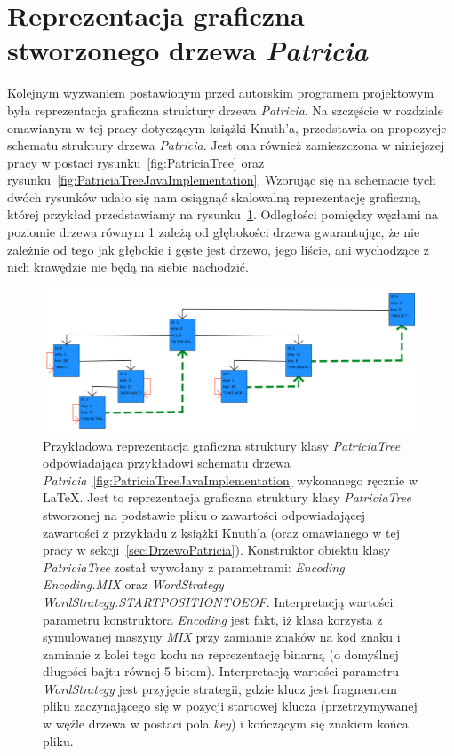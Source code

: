 		\section{Reprezentacja graficzna stworzonego drzewa \emph{Patricia}}\label{sec:czescPraktycznaReprezentacjaGraficzna}
		
		Kolejnym wyzwaniem postawionym przed autorskim programem projektowym była reprezentacja graficzna struktury drzewa \emph{Patricia}. Na szczęście w rozdziale omawianym w tej pracy dotyczącym książki Knuth'a, przedstawia on propozycje schematu struktury drzewa \emph{Patricia}. Jest ona również zamieszczona w niniejszej pracy w postaci rysunku~\ref{fig:PatriciaTree} oraz rysunku~\ref{fig:PatriciaTreeJavaImplementation}. Wzorując się na schemacie tych dwóch rysunków udało się nam osiągnąć skalowalną reprezentację graficzną, której przykład przedstawiamy na rysunku~\ref{fig:PatriciaTreeVisualRepresentation}. Odległości pomiędzy węzłami na poziomie drzewa równym 1 zależą od głębokości drzewa gwarantując, że nie zależnie od tego jak głębokie i gęste jest drzewo, jego liście, ani wychodzące z nich krawędzie nie będą na siebie nachodzić.
		
        \begin{figure}[htb]
    		\caption{Przykładowa reprezentacja graficzna struktury klasy \emph{PatriciaTree} odpowiadająca przykładowi schematu drzewa \emph{Patricia}~\ref{fig:PatriciaTreeJavaImplementation} wykonanego ręcznie w \LaTeX{}. Jest to reprezentacja graficzna struktury klasy \emph{PatriciaTree} stworzonej na podstawie pliku o zawartości odpowiadającej zawartości z przykładu z książki Knuth'a (oraz omawianego w tej pracy w sekcji~\ref{sec:DrzewoPatricia}). Konstruktor obiektu klasy \emph{PatriciaTree} został wywołany z parametrami: \emph{Encoding Encoding.MIX} oraz \emph{WordStrategy WordStrategy.START\textunderscore POSITION\textunderscore TO\textunderscore EOF}. Interpretacją wartości parametru konstruktora \emph{Encoding} jest fakt, iż klasa korzysta z symulowanej maszyny \emph{MIX} przy zamianie znaków na kod znaku i zamianie z kolei tego kodu na reprezentację binarną (o domyślnej długości bajtu równej 5 bitom). Interpretacją wartości parametru \emph{WordStrategy} jest przyjęcie strategii, gdzie klucz jest fragmentem pliku zaczynającego się w pozycji startowej klucza (przetrzymywanej w węźle drzewa w postaci pola \emph{key}) i kończącym się znakiem końca pliku.}\label{fig:PatriciaTreeVisualRepresentation}
    		\centering
    		\includegraphics[width = \textwidth]{visaulRepresentation1.png}
    	\end{figure}
		
